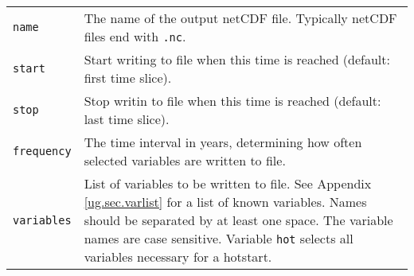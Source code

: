 \begin{center}
\begin{supertabular}{|l|p{11cm}|}
    \hline
    \texttt{name} & The name of the output netCDF file. Typically netCDF files end with \texttt{.nc}.\\
    \texttt{start} & Start writing to file when this time is reached (default: first time slice).\\
    \texttt{stop} & Stop writin to file when this time is reached (default: last time slice). \\
    \texttt{frequency} & The time interval in years, determining how often selected variables are written to file.\\
    \texttt{variables} & List of variables to be written to file. See Appendix \ref{ug.sec.varlist} for a list of known variables. Names should be separated by at least one space. The variable names are case sensitive. Variable \texttt{hot} selects all variables necessary for a hotstart.\\
    \hline
  \end{supertabular}
\end{center}

